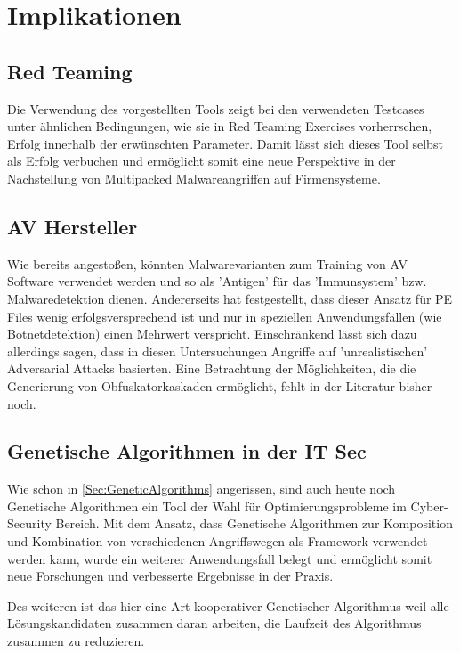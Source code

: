 \section{Implikationen}
\subsection{Red Teaming}
Die Verwendung des vorgestellten Tools zeigt bei den verwendeten Testcases unter ähnlichen Bedingungen, wie sie in Red Teaming Exercises vorherrschen, Erfolg innerhalb der erwünschten Parameter. Damit lässt sich dieses Tool selbst als Erfolg verbuchen und ermöglicht somit eine neue Perspektive in der Nachstellung von Multipacked Malwareangriffen auf Firmensysteme. 
\subsection{AV Hersteller}
Wie \cite{murali_2023_evolving} bereits angestoßen, könnten Malwarevarianten zum Training  von AV Software verwendet werden und so als 'Antigen' für das 'Immunsystem' bzw. Malwaredetektion dienen. Andererseits hat \cite{dyrmishi_2023_on} festgestellt, dass dieser Ansatz für PE Files wenig erfolgsversprechend ist und nur in speziellen Anwendungsfällen (wie Botnetdetektion) einen Mehrwert verspricht. Einschränkend lässt sich dazu allerdings sagen, dass in diesen Untersuchungen Angriffe auf 'unrealistischen' Adversarial Attacks basierten. Eine Betrachtung der Möglichkeiten, die die Generierung von Obfuskatorkaskaden ermöglicht, fehlt in der Literatur bisher noch.
\subsection{Genetische Algorithmen in der IT Sec}
Wie schon in \ref{Sec:GeneticAlgorithms} angerissen, sind auch heute noch Genetische Algorithmen ein Tool der Wahl für Optimierungsprobleme im Cyber-Security Bereich. Mit dem Ansatz, dass Genetische Algorithmen zur Komposition und Kombination von verschiedenen Angriffswegen als Framework verwendet werden kann, wurde ein weiterer Anwendungsfall belegt und ermöglicht somit neue Forschungen und verbesserte Ergebnisse in der Praxis.

Des weiteren ist das hier eine Art kooperativer Genetischer Algorithmus weil alle Lösungskandidaten zusammen daran arbeiten, die Laufzeit des Algorithmus zusammen zu reduzieren.